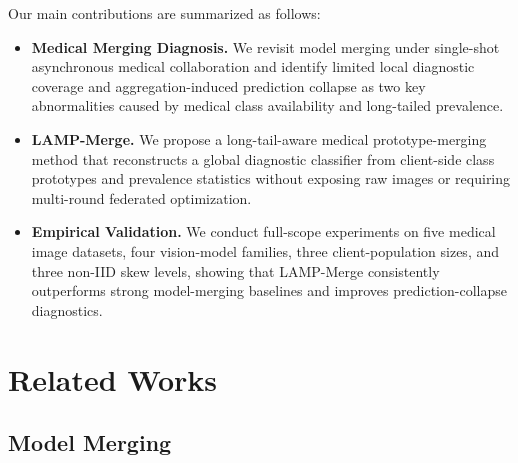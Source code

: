 \documentclass[letterpaper]{article} %
\begin{document}
Our main contributions are summarized as follows:
\begin{itemize}
    \item \textbf{Medical Merging Diagnosis.} We revisit model merging under single-shot asynchronous medical collaboration and identify limited local diagnostic coverage and aggregation-induced prediction collapse as two key abnormalities caused by medical class availability and long-tailed prevalence.
    \item \textbf{LAMP-Merge.} We propose a long-tail-aware medical prototype-merging method that reconstructs a global diagnostic classifier from client-side class prototypes and prevalence statistics without exposing raw images or requiring multi-round federated optimization.
    \item \textbf{Empirical Validation.} We conduct full-scope experiments on five medical image datasets, four vision-model families, three client-population sizes, and three non-IID skew levels, showing that LAMP-Merge consistently outperforms strong model-merging baselines and improves prediction-collapse diagnostics.
\end{itemize}

\section{Related Works}

\subsection{Model Merging}
\end{document}

